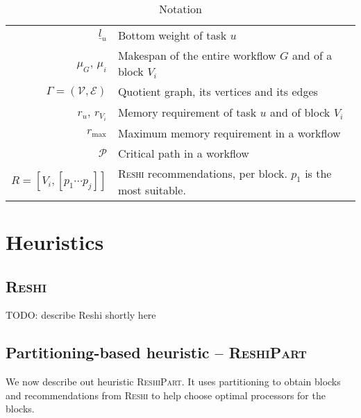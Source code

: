 \documentclass[11pt]{article}
\newcommand{\algo}[1]{\textsc{#1}}
\newcommand{\reshipart}{\algo{ReshiPart}\xspace}
\newcommand{\reshi}{\algo{Reshi}\xspace}
\newcommand{\bottomlevel}[1]{\underline{l}_{#1}} %
\newcommand{\criticalpath}{\mathcal{P}}
\begin{document}
\begin{table}[h!]
\begin{center}
\begin{tabular}{rl}
                $\bottomlevel{u}$                      & Bottom weight of task $u$       \\
                $\mu_G$, $\mu_i$ & Makespan of the entire workflow $G$ and of a block $V_i$                     \\
                $\Gamma = (\mathcal{V}, \mathcal{E})$                              & Quotient graph, its vertices and its edges                            \\
                $r_u$, $r_{V_i}$                            & Memory requirement of task $u$ and of block $V_i$                       \\
                $r_{\max}$                   & Maximum memory requirement in a workflow                        \\
                $\criticalpath$        & Critical path in a workflow \\
                $R = [{V_i, [p_1\cdots p_j]}]$        & \reshi recommendations, per block. $p_1$ is the most suitable. \\
                \hline
            \end{tabular}
        \end{center}
        \caption{Notation} \label{tabnotation}
    \end{table}


    \section{Heuristics} %
    \label{sec:heuristics}

    \subsection{\reshi}

    TODO: describe Reshi shortly here

    \subsection{Partitioning-based heuristic -- \reshipart}
    \label{sec.daghetpart}

    We now describe out heuristic \reshipart.
    It uses partitioning to obtain blocks and recommendations from \reshi to help choose optimal processors for the blocks.
\end{document}
